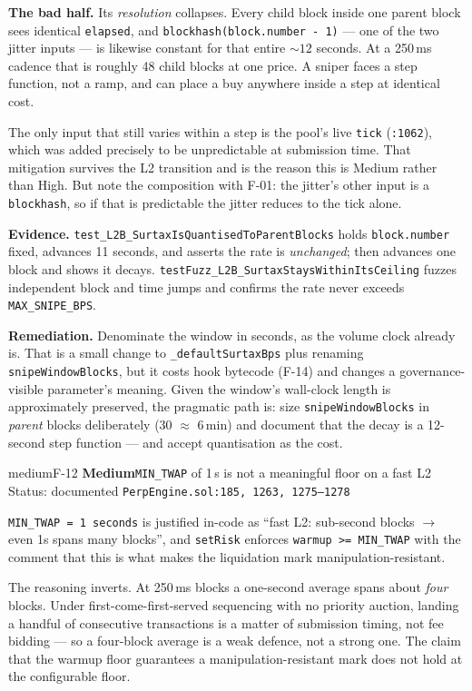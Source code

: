 \documentclass[11pt,a4paper]{article}
\newcommand{\code}[1]{\texttt{\small #1}}
\newcommand{\fileref}[1]{\texttt{\scriptsize #1}}
\begin{document}
\textbf{The bad half.} Its \emph{resolution} collapses. Every child block inside
one parent block sees identical \code{elapsed}, and
\code{blockhash(block.number - 1)} --- one of the two jitter inputs --- is likewise
constant for that entire ${\sim}12$ seconds. At a 250\,ms cadence that is roughly
48 child blocks at one price. A sniper faces a step function, not a ramp, and can
place a buy anywhere inside a step at identical cost.

The only input that still varies within a step is the pool's live \code{tick}
(\fileref{:1062}), which was added precisely to be unpredictable at submission
time. That mitigation survives the L2 transition and is the reason this is
Medium rather than High. But note the composition with F-01: the jitter's other
input is a \code{blockhash}, so if that is predictable the jitter reduces to the
tick alone.

\textbf{Evidence.} \code{test\_L2B\_SurtaxIsQuantisedToParentBlocks} holds
\code{block.number} fixed, advances 11 seconds, and asserts the rate is
\emph{unchanged}; then advances one block and shows it decays.
\code{testFuzz\_L2B\_SurtaxStaysWithinItsCeiling} fuzzes independent block and time
jumps and confirms the rate never exceeds \code{MAX\_SNIPE\_BPS}.

\textbf{Remediation.} Denominate the window in seconds, as the volume clock
already is. That is a small change to \code{\_defaultSurtaxBps} plus renaming
\code{snipeWindowBlocks}, but it costs hook bytecode (F-14) and changes a
governance-visible parameter's meaning. Given the window's wall-clock length is
approximately preserved, the pragmatic path is: size
\code{snipeWindowBlocks} in \emph{parent} blocks deliberately (30 $\approx$ 6\,min)
and document that the decay is a 12-second step function --- and accept
quantisation as the cost.

\begin{findingbox}{medium}{F-12 \quad \textbf{Medium}\quad \code{MIN\_TWAP} of 1\,s is not a meaningful floor on a fast L2 \quad Status: documented}
\fileref{PerpEngine.sol:185, 1263, 1275--1278}
\end{findingbox}

\code{MIN\_TWAP = 1 seconds} is justified in-code as ``fast L2: sub-second blocks
$\rightarrow$ even 1s spans many blocks'', and \code{setRisk} enforces
\code{warmup >= MIN\_TWAP} with the comment that this is what makes the
liquidation mark manipulation-resistant.

The reasoning inverts. At 250\,ms blocks a one-second average spans about
\emph{four} blocks. Under first-come-first-served sequencing with no priority
auction, landing a handful of consecutive transactions is a matter of submission
timing, not fee bidding --- so a four-block average is a weak defence, not a strong
one. The claim that the warmup floor guarantees a manipulation-resistant mark does
not hold at the configurable floor.
\end{document}
